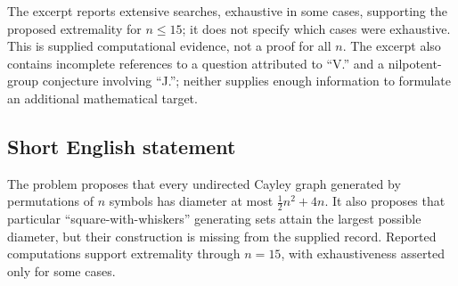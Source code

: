 \documentclass[11pt]{article}
\begin{document}
The excerpt reports extensive searches, exhaustive in some cases, supporting the proposed extremality for \(n\leq 15\); it does not specify which cases were exhaustive. This is supplied computational evidence, not a proof for all \(n\). The excerpt also contains incomplete references to a question attributed to ``V.'' and a nilpotent-group conjecture involving ``J.''; neither supplies enough information to formulate an additional mathematical target.
\subsection{Short English statement}
The problem proposes that every undirected Cayley graph generated by permutations of \(n\) symbols has diameter at most \(\frac12 n^2+4n\). It also proposes that particular ``square-with-whiskers'' generating sets attain the largest possible diameter, but their construction is missing from the supplied record. Reported computations support extremality through \(n=15\), with exhaustiveness asserted only for some cases.
\end{document}
